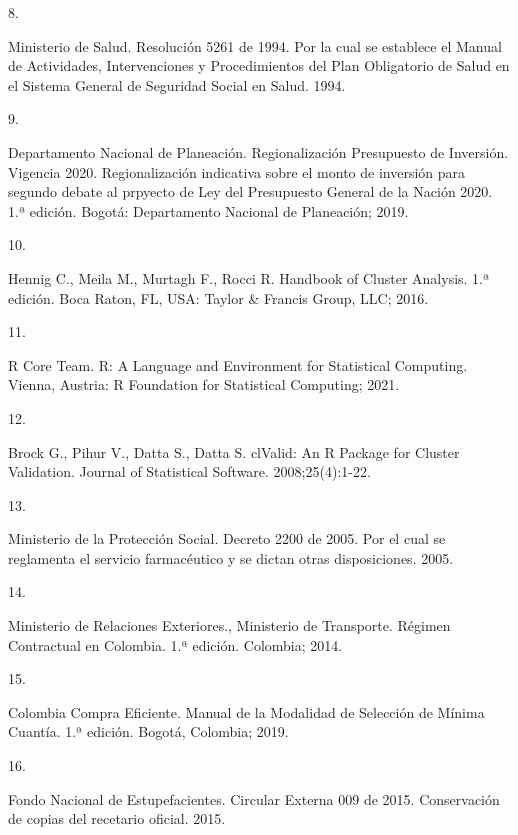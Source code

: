 \documentclass[
]{book}
\newlength{\cslhangindent}
\newlength{\csllabelwidth}
\newlength{\cslentryspacingunit} %
\newenvironment{CSLReferences}[2] %
 {%
  \setlength{\parindent}{0pt}
  \ifodd #1
  \let\oldpar\par
  \def\par{\hangindent=\cslhangindent\oldpar}
  \fi
  \setlength{\parskip}{#2\cslentryspacingunit}
 }%
 {}
\newcommand{\CSLLeftMargin}[1]{\parbox[t]{\csllabelwidth}{#1}}
\newcommand{\CSLRightInline}[1]{\parbox[t]{\linewidth - \csllabelwidth}{#1}\break}
\begin{document}
\begin{CSLReferences}{0}{0}
\leavevmode{}%
\CSLLeftMargin{8. }
\CSLRightInline{Ministerio de Salud. {Resoluci{ó}n 5261 de 1994. Por la cual se establece el Manual de Actividades, Intervenciones y Procedimientos del Plan Obligatorio de Salud en el Sistema General de Seguridad Social en Salud.} 1994.}

\leavevmode{}%
\CSLLeftMargin{9. }
\CSLRightInline{Departamento Nacional de Planeación. {Regionalizaci{ó}n Presupuesto de Inversi{ó}n. Vigencia 2020. Regionalizaci{ó}n indicativa sobre el monto de inversi{ó}n para segundo debate al prpyecto de Ley del Presupuesto General de la Naci{ó}n 2020}. 1.ª edición. Bogot{á}: Departamento Nacional de Planeaci{ó}n; 2019.}

\leavevmode{}%
\CSLLeftMargin{10. }
\CSLRightInline{Hennig C., Meila M., Murtagh F., Rocci R. {Handbook of Cluster Analysis}. 1.ª edición. Boca Raton, FL, USA: Taylor \& Francis Group, LLC; 2016.}

\leavevmode{}%
\CSLLeftMargin{11. }
\CSLRightInline{R Core Team. R: A Language and Environment for Statistical Computing. Vienna, Austria: R Foundation for Statistical Computing; 2021.}

\leavevmode{}%
\CSLLeftMargin{12. }
\CSLRightInline{Brock G., Pihur V., Datta S., Datta S. {clValid}: An {R} Package for Cluster Validation. Journal of Statistical Software. 2008;25(4):1-22.}

\leavevmode{}%
\CSLLeftMargin{13. }
\CSLRightInline{Ministerio de la Protección Social. {Decreto 2200 de 2005. Por el cual se reglamenta el servicio farmac{é}utico y se dictan otras disposiciones.} 2005.}

\leavevmode{}%
\CSLLeftMargin{14. }
\CSLRightInline{Ministerio de Relaciones Exteriores., Ministerio de Transporte. {R{é}gimen Contractual en Colombia}. 1.ª edición. Colombia; 2014.}

\leavevmode{}%
\CSLLeftMargin{15. }
\CSLRightInline{Colombia Compra Eficiente. {Manual de la Modalidad de Selecci{ó}n de M{í}nima Cuant{í}a}. 1.ª edición. Bogot{á}, Colombia; 2019.}

\leavevmode{}%
\CSLLeftMargin{16. }
\CSLRightInline{Fondo Nacional de Estupefacientes. {Circular Externa 009 de 2015. Conservaci{ó}n de copias del recetario oficial.} 2015.}


\end{CSLReferences}
\end{document}

